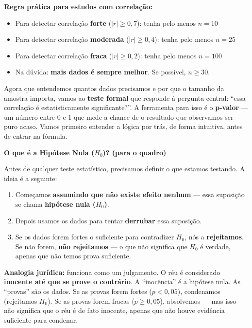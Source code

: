 \begin{NoteBox}
\textbf{Regra prática para estudos com correlação:}
\begin{itemize}
  \item Para detectar correlação \textbf{forte} ($|r| \geq 0{,}7$): tenha pelo menos $n = 10$
  \item Para detectar correlação \textbf{moderada} ($|r| \geq 0{,}4$): tenha pelo menos $n = 25$
  \item Para detectar correlação \textbf{fraca} ($|r| \geq 0{,}2$): tenha pelo menos $n = 100$
  \item Na dúvida: \textbf{mais dados é sempre melhor}. Se possível, $n \geq 30$.
\end{itemize}
\end{NoteBox}

Agora que entendemos quantos dados precisamos e por que o tamanho da
amostra importa, vamos ao \textbf{teste formal} que responde à pergunta
central: ``essa correlação é estatisticamente significante?''.
A ferramenta para isso é o \textbf{p-valor} — um número entre 0 e 1
que mede a chance de o resultado que observamos ser puro acaso.
Vamos primeiro entender a lógica por trás, de forma intuitiva, antes
de entrar na fórmula.

\begin{BoardBox}
\textbf{O que é a Hipótese Nula ($H_0$)? (para o quadro)}

Antes de qualquer teste estatístico, precisamos definir o que estamos
testando. A ideia é a seguinte:

\begin{enumerate}
  \item Começamos \textbf{assumindo que não existe efeito nenhum} — essa
  suposição se chama \textbf{hipótese nula ($H_0$)}.
  \item Depois usamos os dados para tentar \textbf{derrubar} essa suposição.
  \item Se os dados forem fortes o suficiente para contradizer $H_0$, nós
  a \textbf{rejeitamos}. Se não forem, \textbf{não rejeitamos} — o que não
  significa que $H_0$ é verdade, apenas que não temos prova suficiente.
\end{enumerate}

\textbf{Analogia jurídica:} funciona como um julgamento.
O réu é considerado \textbf{inocente até que se prove o contrário}.
A ``inocência'' é a hipótese nula. As ``provas'' são os dados.
Se as provas forem fortes ($p < 0{,}05$), condenamos (rejeitamos $H_0$).
Se as provas forem fracas ($p \geq 0{,}05$), absolvemos — mas isso não
significa que o réu é de fato inocente, apenas que não houve evidência
suficiente para condenar.
\end{BoardBox}

